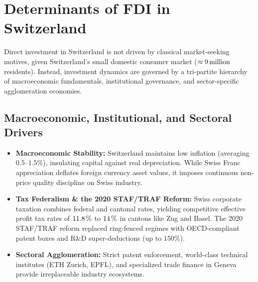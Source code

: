 
\section{Determinants of FDI in Switzerland}

Direct investment in Switzerland is not driven by classical market-seeking motives, given Switzerland's small domestic consumer market ($\approx 9\,\text{million}$ residents). Instead, investment dynamics are governed by a tri-partite hierarchy of macroeconomic fundamentals, institutional governance, and sector-specific agglomeration economies.

\subsection{Macroeconomic, Institutional, and Sectoral Drivers}

\begin{itemize}[leftmargin=1.5em, itemsep=2pt]
    \item \textbf{Macroeconomic Stability:} Switzerland maintains low inflation (averaging $0.5\text{--}1.5\%$), insulating capital against real depreciation. While Swiss Franc appreciation deflates foreign currency asset values, it imposes continuous non-price quality discipline on Swiss industry.
    \item \textbf{Tax Federalism \& the 2020 STAF/TRAF Reform:} Swiss corporate taxation combines federal and cantonal rates, yielding competitive effective profit tax rates of $11.8\,\%$ to $14\,\%$ in cantons like Zug and Basel. The 2020 STAF/TRAF reform replaced ring-fenced regimes with OECD-compliant patent boxes and R\&D super-deductions (up to $150\%$).
    \item \textbf{Sectoral Agglomeration:} Strict patent enforcement, world-class technical institutes (ETH Zurich, EPFL), and specialized trade finance in Geneva provide irreplaceable industry ecosystems.
\end{itemize}

